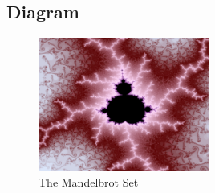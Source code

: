 \documentclass{article}
\begin{document}
\subsection{Diagram}
\begin{figure}[H]
  \centering
  \includegraphics[width=0.5\textwidth]{mandelbrot.png}
  \caption{The Mandelbrot Set}
\end{figure}



\end{document}
